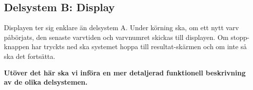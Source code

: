   \subsection{Delsystem B: Display}

  Displayen ter sig enklare än delsystem A. Under körning ska, om ett nytt varv
  påbörjats, den senaste varvtiden och varvnumret skickas till displayen. Om
  stopp-knappen har tryckts ned ska systemet hoppa till resultat-skärmen och om
  inte så ska det fortsätta.

  \textbf{Utöver det här ska vi införa en mer detaljerad funktionell beskrivning
  av de olika delsystemen.}
